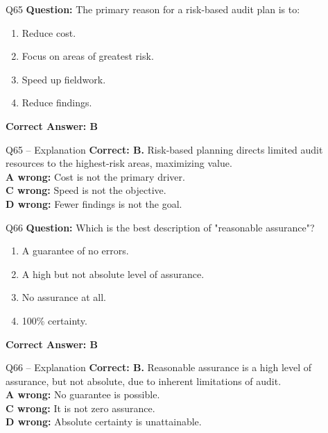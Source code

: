 \documentclass[aspectratio=169,10pt]{beamer}
\begin{document}
	\begin{frame}[t]{Q65}
		\small
		\textbf{Question:} The primary reason for a risk-based audit plan is to:
		\begin{enumerate}[label=\Alph*.,itemsep=1pt,topsep=2pt]
			\item Reduce cost.
			\item Focus on areas of greatest risk.
			\item Speed up fieldwork.
			\item Reduce findings.
		\end{enumerate}
		\vspace{4pt}
		\textbf{Correct Answer: B}
	\end{frame}
	
	\begin{frame}[t]{Q65 -- Explanation}
		\small
		\textbf{Correct: B.} Risk-based planning directs limited audit resources to the highest-risk areas, maximizing value. \\[4pt]
		\textbf{A wrong:} Cost is not the primary driver. \\[2pt]
		\textbf{C wrong:} Speed is not the objective. \\[2pt]
		\textbf{D wrong:} Fewer findings is not the goal.
	\end{frame}
	
	\begin{frame}[t]{Q66}
		\small
		\textbf{Question:} Which is the best description of "reasonable assurance"?
		\begin{enumerate}[label=\Alph*.,itemsep=1pt,topsep=2pt]
			\item A guarantee of no errors.
			\item A high but not absolute level of assurance.
			\item No assurance at all.
			\item 100\% certainty.
		\end{enumerate}
		\vspace{4pt}
		\textbf{Correct Answer: B}
	\end{frame}
	
	\begin{frame}[t]{Q66 -- Explanation}
		\small
		\textbf{Correct: B.} Reasonable assurance is a high level of assurance, but not absolute, due to inherent limitations of audit. \\[4pt]
		\textbf{A wrong:} No guarantee is possible. \\[2pt]
		\textbf{C wrong:} It is not zero assurance. \\[2pt]
		\textbf{D wrong:} Absolute certainty is unattainable.
	\end{frame}
	
\end{document}
